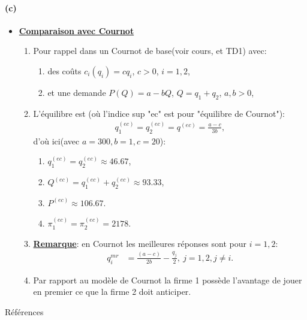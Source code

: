 \begin{frame}[allowframebreaks]{\insertsection}
\framesubtitle{(c)}
   \begin{itemize}
\item \underline{\textbf{Comparaison avec Cournot}}
 \begin{enumerate}[$\cdot$]
\item Pour rappel dans un Cournot de base(voir cours, et TD1) avec:
\begin{enumerate}[$\cdot$]
\item des coûts $c_i(q_i) = cq_i$, $c>0$, $i=1, 2$,
\item et une demande $P(Q) = a - bQ$, $Q=q_1+q_2$, $a, b > 0$,
\end{enumerate}
\item L'équilibre est (où l'indice sup "ec" est pour "équilibre de Cournot"):
\begin{align*}
    q_1^{(ec)} = q_2^{(ec)} = q^{(ec)} = \frac{a-c}{3b},
\end{align*}
d'où ici(avec $a=300, b=1, c=20$): 
\begin{enumerate}[-]
\item $q_1^{(ec)}=q_2^{(ec)}\approx 46.67$, 
\item $Q^{(ec)} = q_1^{(ec)}+q_2^{(ec)} \approx 93.33$,
\item $P^{(ec)} \approx 106.67$.
\item $\pi^{(ec)}_1 = \pi^{(ec)}_2 = 2178$.
\end{enumerate}

\item \textbf{\underline{Remarque}}: en Cournot les meilleures réponses sont pour $i=1, 2$:
\begin{align*}
    q_i^{mr}&=\frac{(a-c)}{2b} - \frac{q_j}{2}, \ j=1, 2, j\neq i.
\end{align*} 
\item Par rapport au modèle de Cournot la firme 1 possède l'avantage de jouer en premier ce que la firme 2 doit anticiper.
\end{enumerate}
\end{itemize}
\end{frame}
\begin{frame}[allowframebreaks]{Références}


\end{frame}


